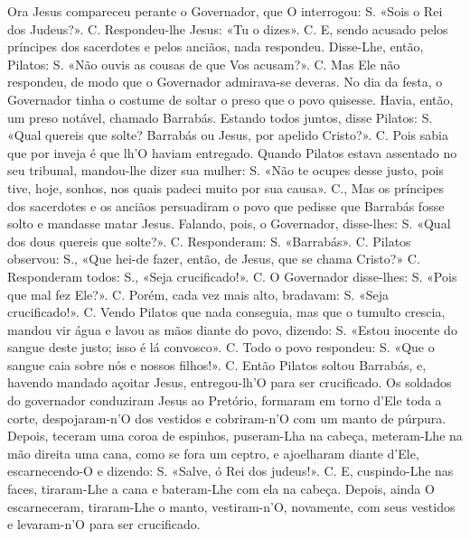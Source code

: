 \begin{paracol}{2}
{Ora Jesus compareceu perante o Governador, que O interrogou: {\redx S.} «Sois o Rei dos Judeus?». {\redx C.} Respondeu-lhe Jesus: «Tu o dizes». {\redx C.} E, sendo acusado pelos príncipes dos sacerdotes e pelos anciãos, nada respondeu. Disse-Lhe, então, Pilatos: {\redx S.} «Não ouvis as cousas de que Vos acusam?». {\redx C.} Mas Ele não respondeu, de modo que o Governador admirava-se deveras. No dia da festa, o Governador tinha o costume de soltar o preso que o povo quisesse. Havia, então, um preso notável, chamado Barrabás. Estando todos juntos, disse Pilatos: {\redx S.} «Qual quereis que solte? Barrabás ou Jesus, por apelido Cristo?». {\redx C.} Pois sabia que por inveja é que lh’O haviam entregado. Quando Pilatos estava assentado no seu tribunal, mandou-lhe dizer sua mulher: {\redx S.} «Não te ocupes desse justo, pois tive, hoje, sonhos, nos quais padeci muito por sua causa». {\redx C.}, Mas os príncipes dos sacerdotes e os anciãos persuadiram o povo que pedisse que Barrabás fosse solto e mandasse matar Jesus. Falando, pois, o Governador, disse-lhes: {\redx S.} «Qual dos dous quereis que solte?». {\redx C.} Responderam: {\redx S.} «Barrabás». {\redx C.} Pilatos observou: {\redx S.}, «Que hei-de fazer, então, de Jesus, que se chama Cristo?» {\redx C.} Responderam todos: {\redx S.}, «Seja crucificado!». {\redx C.} O Governador disse-lhes: {\redx S.} «Pois que mal fez Ele?». {\redx C.} Porém, cada vez mais alto, bradavam: {\redx S.} «Seja crucificado!». {\redx C.} Vendo Pilatos que nada conseguia, mas que o tumulto crescia, mandou vir água e lavou as mãos diante do povo, dizendo: {\redx S.} «Estou inocente do sangue deste justo; isso é lá convosco». {\redx C.} Todo o povo respondeu: {\redx S.} «Que o sangue caia sobre nós e nossos filhos!». {\redx C.} Então Pilatos soltou Barrabás, e, havendo mandado açoitar Jesus, entregou-lh’O para ser crucificado. Os soldados do governador conduziram Jesus ao Pretório, formaram em torno d’Ele toda a corte, despojaram-n’O dos vestidos e cobriram-n’O com um manto de púrpura. Depois, teceram uma coroa de espinhos, puseram-Lha na cabeça, meteram-Lhe na mão direita uma cana, como se fora um ceptro, e ajoelharam diante d’Ele, escarnecendo-O e dizendo: {\redx S.} «Salve, ó Rei dos judeus!». {\redx C.} E, cuspindo-Lhe nas faces, tiraram-Lhe a cana e bateram-Lhe com ela na cabeça. Depois, ainda O escarneceram, tiraram-Lhe o manto, vestiram-n’O, novamente, com seus vestidos e levaram-n’O para ser crucificado.
}\switchcolumn*\latim{
}
\end{paracol}
